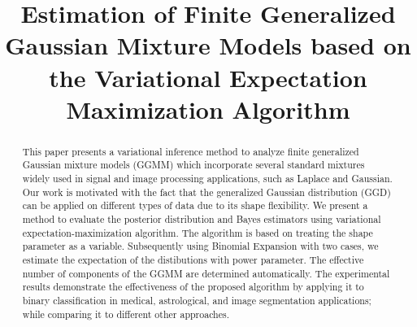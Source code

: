 \documentclass[conference]{IEEEtran}
\begin{document}
\title{Estimation of Finite Generalized Gaussian Mixture Models based on the Variational Expectation Maximization Algorithm\\
}
\author{
\and
{}
\and
{}
\and
{}
}
\maketitle

\begin{abstract}
    This paper presents a variational inference method to analyze finite generalized Gaussian mixture models (GGMM) which incorporate several standard mixtures widely used in signal and image processing applications, such as Laplace and Gaussian. Our work is motivated with the fact that the generalized Gaussian distribution (GGD) can be applied on different types of data due to its shape flexibility. We present a method to evaluate the posterior distribution and Bayes estimators using variational expectation-maximization algorithm. 
    The algorithm is based on treating the shape parameter as a variable. Subsequently using Binomial Expansion with two cases, we estimate the expectation of the distibutions with power parameter.
    The effective number of components of the GGMM are determined automatically. The experimental results demonstrate the effectiveness of the proposed algorithm by applying it to
    binary classification in medical, astrological, and image segmentation applications; while comparing it to different other approaches.    
\end{abstract}
\end{document}
